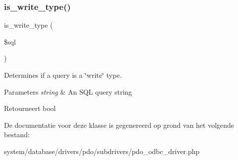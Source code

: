 \subsubsection{\texorpdfstring{is\_write\_type()}{is\_write\_type()}}
{\footnotesize\ttfamily is\+\_\+write\+\_\+type (\begin{DoxyParamCaption}\item[{}]{\$sql }\end{DoxyParamCaption})}

Determines if a query is a \char`\"{}write\char`\"{} type.


\begin{DoxyParams}{Parameters}
{\em string} & An S\+QL query string \\
\hline
\end{DoxyParams}
\begin{DoxyReturn}{Retourneert}
bool 
\end{DoxyReturn}


De documentatie voor deze klasse is gegenereerd op grond van het volgende bestand\+:\begin{DoxyCompactItemize}
\item 
system/database/drivers/pdo/subdrivers/pdo\+\_\+odbc\+\_\+driver.\+php\end{DoxyCompactItemize}
